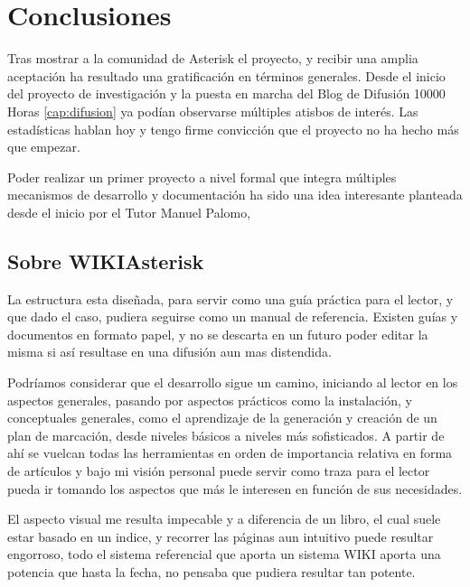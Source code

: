 
\section{Conclusiones}

Tras mostrar a la comunidad de Asterisk el proyecto, y recibir una amplia aceptación ha resultado una gratificación en términos generales. Desde el inicio del proyecto de investigación y la puesta en marcha del Blog de Difusión 10000 Horas \ref{cap:difusion} ya podían observarse múltiples atisbos de interés. Las estadísticas hablan hoy y tengo firme convicción que el proyecto no ha hecho más que empezar.

Poder realizar un primer proyecto a nivel formal que integra múltiples mecanismos de desarrollo y documentación ha sido una idea interesante planteada desde el inicio por el Tutor Manuel Palomo, 

\subsection{Sobre WIKIAsterisk}

La estructura esta diseñada, para servir como una guía práctica para el lector, y que dado el caso, pudiera seguirse como un manual de referencia. Existen guías y documentos en formato papel, y no se descarta en un futuro poder editar la misma si así resultase en una difusión aun mas distendida.

Podríamos considerar que el desarrollo sigue un camino, iniciando al lector en los aspectos generales, pasando por aspectos prácticos como la instalación, y conceptuales generales, como el aprendizaje de la generación y creación de un plan de marcación, desde niveles básicos a niveles más sofisticados. A partir de ahí se vuelcan todas las herramientas en orden de importancia relativa en forma de artículos y bajo mi visión personal puede servir como traza para el lector pueda ir tomando los aspectos que más le interesen en función de sus necesidades.

El aspecto visual me resulta impecable y a diferencia de un libro, el cual suele estar basado en un indice, y recorrer las páginas aun intuitivo puede resultar engorroso, todo el sistema referencial que aporta un sistema WIKI aporta una potencia que hasta la fecha, no pensaba que pudiera resultar tan potente. 

